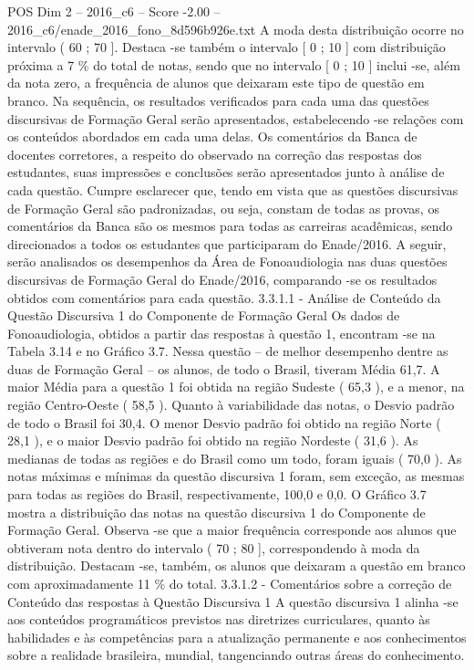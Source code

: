 \begin{textsample}{POS Dim 2 – 2016\_c6 – Score -2.00 – 2016\_c6/enade\_2016\_fono\_8d596b926e.txt}
A moda desta distribuição ocorre no intervalo ( 60 ; 70 ].
Destaca -se também o intervalo [ 0 ; 10 ] com distribuição próxima a 7 \% do total de notas, sendo que no intervalo [ 0 ; 10 ] inclui -se, além da nota zero, a frequência de alunos que deixaram este tipo de questão em branco.
Na sequência, os resultados verificados para cada uma das questões discursivas de Formação Geral serão apresentados, estabelecendo -se relações com os conteúdos abordados em cada uma delas.
Os comentários da Banca de docentes corretores, a respeito do observado na correção das respostas dos estudantes, suas impressões e conclusões serão apresentados junto à análise de cada questão.
Cumpre esclarecer que, tendo em vista que as questões discursivas de Formação Geral são padronizadas, ou seja, constam de todas as provas, os comentários da Banca são os mesmos para todas as carreiras acadêmicas, sendo direcionados a todos os estudantes que participaram do Enade/2016.
A seguir, serão analisados os desempenhos da Área de Fonoaudiologia nas duas questões discursivas de Formação Geral do Enade/2016, comparando -se os resultados obtidos com comentários para cada questão. 3.3.1.1 - Análise de Conteúdo da Questão Discursiva 1 do Componente de Formação Geral Os dados de Fonoaudiologia, obtidos a partir das respostas à questão 1, encontram -se na Tabela 3.14 e no Gráfico 3.7.
Nessa questão – de melhor desempenho dentre as duas de Formação Geral – os alunos, de todo o Brasil, tiveram Média 61,7.
A maior Média para a questão 1 foi obtida na região Sudeste ( 65,3 ), e a menor, na região Centro-Oeste ( 58,5 ).
Quanto à variabilidade das notas, o Desvio padrão de todo o Brasil foi 30,4.
O menor Desvio padrão foi obtido na região Norte ( 28,1 ), e o maior Desvio padrão foi obtido na região Nordeste ( 31,6 ).
As medianas de todas as regiões e do Brasil como um todo, foram iguais ( 70,0 ).
As notas máximas e mínimas da questão discursiva 1 foram, sem exceção, as mesmas para todas as regiões do Brasil, respectivamente, 100,0 e 0,0.
O Gráfico 3.7 mostra a distribuição das notas na questão discursiva 1 do Componente de Formação Geral.
Observa -se que a maior frequência corresponde aos alunos que obtiveram nota dentro do intervalo ( 70 ; 80 ], correspondendo à moda da distribuição.
Destacam -se, também, os alunos que deixaram a questão em branco com aproximadamente 11 \% do total. 3.3.1.2 - Comentários sobre a correção de Conteúdo das respostas à Questão Discursiva 1 A questão discursiva 1 alinha -se aos conteúdos programáticos previstos nas diretrizes curriculares, quanto às habilidades e às competências para a atualização permanente e aos conhecimentos sobre a realidade brasileira, mundial, tangenciando outras áreas do conhecimento.

\end{textsample}

